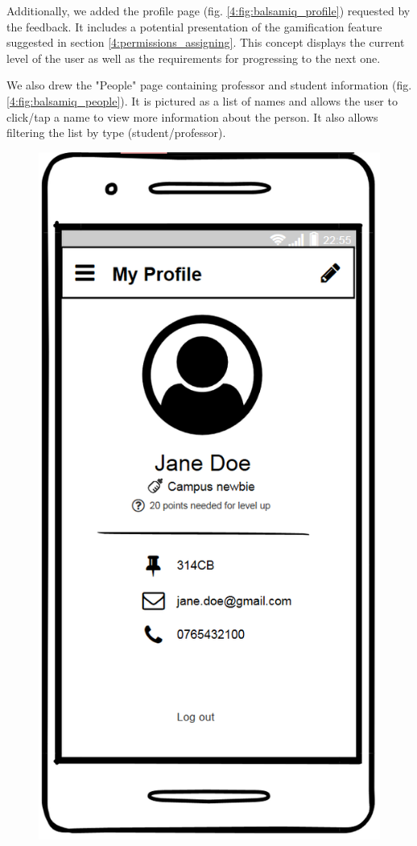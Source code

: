 Additionally, we added the profile page (fig. \ref{4:fig:balsamiq_profile}) requested by the feedback. It includes a potential presentation of the gamification feature suggested in section \ref{4:permissions_assigning}. This concept displays the current level of the user as well as the requirements for progressing to the next one.

We also drew the "People" page containing professor and student information (fig. \ref{4:fig:balsamiq_people}). It is pictured as a list of names and allows the user to click/tap a name to view more information about the person. It also allows filtering the list by type (student/professor).

\begin{figure}[!ht]
    \centering
    \begin{minipage}[t]{0.3\textwidth}
        \captionsetup{justification=centering}
        \includegraphics[width=\textwidth]{figures/app/balsamiq/profile.png}

\end{minipage}
\end{figure}

